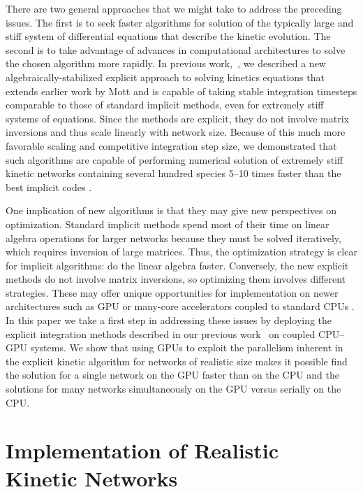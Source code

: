 \documentclass[]{elsart}
\begin{document}
There are two general approaches that we might take to address the 
preceding issues. 
 The first is to seek faster algorithms for solution of the typically 
large and stiff system of differential equations that  describe the kinetic 
evolution. The second is to take advantage of advances in computational 
architectures to solve the chosen algorithm more rapidly.  In previous work,\ 
\cite{guidJCP,guidAsy,guidQSS,guidPE}, we described a new 
algebraically-stabilized explicit approach to solving kinetics equations that 
extends earlier work by Mott \cite{mott99} and is capable of taking stable 
integration timesteps comparable to those of standard implicit methods, even for 
extremely stiff systems of equations. Since the methods are explicit, they do 
not involve matrix inversions and thus scale linearly with network size. Because 
of this much more favorable scaling and competitive integration step size, we 
demonstrated that such algorithms are capable of performing numerical solution 
of extremely stiff kinetic networks containing several hundred species 5--10 
times faster than the best implicit codes 
\cite{guidJCP,guidAsy,guidQSS,guidPE}.

One implication of new algorithms is that they may give new perspectives on 
optimization. Standard implicit methods spend most of their time on linear 
algebra operations for larger networks because they must be solved iteratively, 
which requires inversion of large matrices.  Thus, the optimization strategy is 
clear for implicit algorithms: do the linear algebra faster.  Conversely, the 
new explicit methods do not involve matrix inversions, so optimizing them 
involves different strategies.  These may offer unique opportunities for 
implementation on newer architectures such as GPU or many-core accelerators 
coupled to standard CPUs \cite{guidJCP}. In this paper we take a first step in 
addressing these issues by deploying the explicit integration methods described 
in our previous work\ \cite{guidJCP,guidAsy,guidQSS,guidPE} on  coupled
CPU--GPU systems.
We show that using GPUs to exploit the parallelism inherent in the explicit kinetic 
algorithm for networks of realistic size makes it possible find the solution for
a single network on the GPU faster than on the CPU and the solutions for many
networks simultaneously on the GPU versus serially on the CPU.

\section{Implementation of Realistic Kinetic Networks}
\end{document}
